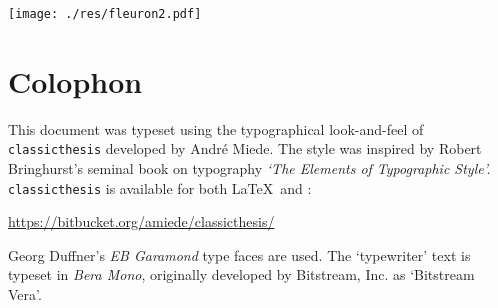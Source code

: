 \pagestyle{empty}

\hfill

\vfill
\begin{center}
\texttt{[image: ./res/fleuron2.pdf]} \\ \medskip
\end{center}


\section*{Colophon}
This document was typeset using the typographical look-and-feel of \texttt{classicthesis} developed by Andr\'e Miede. 
The style was inspired by Robert Bringhurst's seminal book on typography \emph{`The Elements of Typographic Style'.} 
\texttt{classicthesis} is available for both \LaTeX\ and \mLyX: 
\begin{center}
\url{https://bitbucket.org/amiede/classicthesis/}
\end{center}
 
\bigskip


Georg Duffner's \emph{EB Garamond} type faces are used.
The `typewriter' text is typeset in \emph{Bera Mono}, 
originally developed by Bitstream, Inc. as `Bitstream Vera'.

%
%




